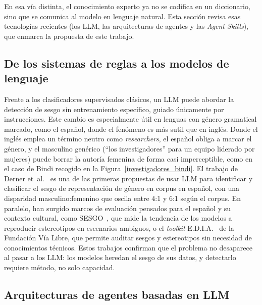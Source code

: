 
En esa vía distinta, el conocimiento experto ya no se codifica en un diccionario,
sino que se comunica al modelo en lenguaje natural. Esta sección revisa esas tecnologías recientes (los LLM, las arquitecturas de agentes y las \textit{Agent Skills}), que
enmarca la propuesta de este trabajo.

\subsection{De los sistemas de reglas a los modelos de lenguaje}

Frente a los clasificadores supervisados clásicos, un LLM puede abordar la
detección de sesgo sin entrenamiento específico, guiado únicamente por
instrucciones. Este cambio es especialmente útil en lenguas con género gramatical
marcado, como el español, donde el fenómeno es más sutil que en inglés. Donde el
inglés emplea un término neutro como \textit{researchers}, el español obliga a
marcar el género, y el masculino genérico (``los investigadores'' para un equipo
liderado por mujeres) puede borrar la autoría femenina de forma casi imperceptible,
como en el caso de Bindi recogido en la Figura~\ref{investigadores_bindi}. El trabajo
de Derner et~al.~\cite{derner2024gender} es una de las primeras propuestas de usar
LLM para identificar y clasificar el sesgo de representación de género en corpus
en español, con una disparidad masculino:femenino que oscila entre 4:1 y 6:1 según
el corpus. En paralelo, han surgido marcos de evaluación pensados para el español y
su contexto cultural, como SESGO~\cite{robles2025sesgo}, que mide la tendencia de
los modelos a reproducir estereotipos en escenarios ambiguos, o el
\textit{toolkit} E.D.I.A.~\cite{edia2024} de la Fundación Vía Libre, que permite
auditar sesgos y estereotipos sin necesidad de conocimientos técnicos. Estos
trabajos confirman que el problema no desaparece al pasar a los LLM: los modelos
heredan el sesgo de sus datos, y detectarlo requiere método, no solo capacidad.

\subsection{Arquitecturas de agentes basadas en LLM}

